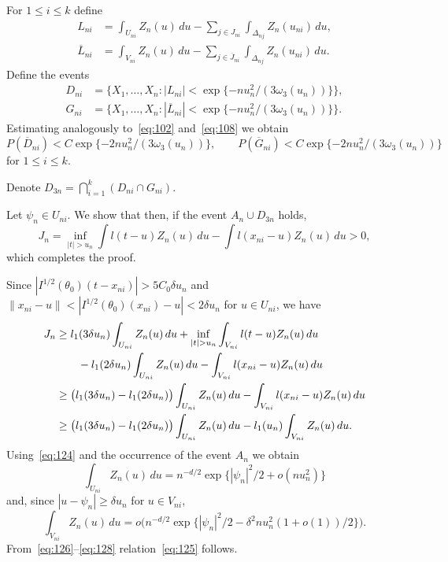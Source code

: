 \documentclass[11pt,a4paper]{article}
\begin{document}
For $1\le i\le k$ define
\begin{align}
L_{ni}&=\int_{U_{ni}}Z_n(u)\,du-\sum_{j\in J_{ni}}\int_{\Delta_{nj}}Z_n(u_{ni})\,du,
\label{eq:120}\\
\overline{L}_{ni}&=\int_{V_{ni}}Z_n(u)\,du-\sum_{j\in\overline{J}_{ni}}\int_{\Delta_{nj}}Z_n(u_{ni})\,du.
\label{eq:121}
\end{align}
Define the events
\begin{align}
D_{ni}&=\bigl\{X_1,\dots,X_n:|L_{ni}|<\exp\{-nu_n^2/(3\omega_3(u_n))\}\bigr\},
\label{eq:122}\\
G_{ni}&=\bigl\{X_1,\dots,X_n:|\overline{L}_{ni}|<\exp\{-nu_n^2/(3\omega_3(u_n))\}\bigr\}.
\label{eq:123}
\end{align}
Estimating analogously to~\eqref{eq:102} and~\eqref{eq:108} we obtain
\begin{equation}
P(\overline{D}_{ni})<C\exp\{-2nu_n^2/(3\omega_3(u_n))\},\qquad
P(\overline{G}_{ni})<C\exp\{-2nu_n^2/(3\omega_3(u_n))\}
\label{eq:124}
\end{equation}
for $1\le i\le k$.

Denote $D_{3n}=\bigcap_{i=1}^k(D_{ni}\cap G_{ni})$.

Let $\psi_n\in U_{ni}$. We show that then, if the event $A_n\cup D_{3n}$ holds,
\begin{equation}
J_n=\inf_{|t|>u_n}\int l(t-u)Z_n(u)\,du-\int l(x_{ni}-u)Z_n(u)\,du>0,
\label{eq:125}
\end{equation}
which completes the proof.

Since $|I^{1/2}(\theta_0)(t-x_{ni})|>5C_0\delta u_n$ and $\|x_{ni}-u\|<|I^{1/2}(\theta_0)(x_{ni})-u|<2\delta u_n$ for $u\in U_{ni}$, we have
\begin{align}
J_n
&\ge l_1(3\delta u_n)\int_{U_{ni}}Z_n(u)\,du+\inf_{|t|>u_n}\int_{V_{ni}}l(t-u)Z_n(u)\,du\notag\\
&\qquad-l_1(2\delta u_n)\int_{U_{ni}}Z_n(u)\,du-\int_{V_{ni}}l(x_{ni}-u)Z_n(u)\,du\notag\\
&\ge\bigl(l_1(3\delta u_n)-l_1(2\delta u_n)\bigr)\int_{U_{ni}}Z_n(u)\,du-\int_{V_{ni}}l(x_{ni}-u)Z_n(u)\,du\notag\\
&\ge\bigl(l_1(3\delta u_n)-l_1(2\delta u_n)\bigr)\int_{U_{ni}}Z_n(u)\,du-l_1(u_n)\int_{V_{ni}}Z_n(u)\,du.
\label{eq:126}
\end{align}
Using~\eqref{eq:124} and the occurrence of the event $A_n$ we obtain
\begin{equation}
\int_{U_{ni}}Z_n(u)\,du=n^{-d/2}\exp\{|\psi_n|^2/2+o(nu_n^2)\}
\label{eq:127}
\end{equation}
and, since $|u-\psi_n|\ge\delta u_n$ for $u\in V_{ni}$,
\begin{equation}
\int_{V_{ni}}Z_n(u)\,du=o\bigl(n^{-d/2}\exp\{|\psi_n|^2/2-\delta^2 nu_n^2(1+o(1))/2\}\bigr).
\label{eq:128}
\end{equation}
From~\eqref{eq:126}--\eqref{eq:128} relation~\eqref{eq:125} follows.
\end{document}
